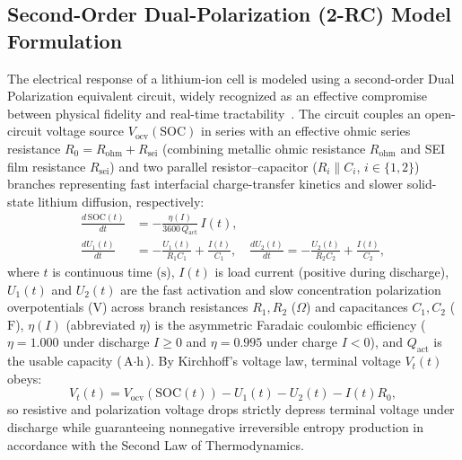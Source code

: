 \documentclass[10pt,a4paper]{article}
\begin{document}
\subsection{Second-Order Dual-Polarization (2-RC) Model Formulation}
The electrical response of a lithium-ion cell is modeled using a second-order Dual Polarization equivalent circuit, widely recognized as an effective compromise between physical fidelity and real-time tractability~\cite{Hu2012ecm,Xiong2014}. The circuit couples an open-circuit voltage source $V_{\text{ocv}}(\text{SOC})$ in series with an effective ohmic series resistance $R_0 = R_{\text{ohm}} + R_{\text{sei}}$ (combining metallic ohmic resistance $R_{\text{ohm}}$ and SEI film resistance $R_{\text{sei}}$) and two parallel resistor--capacitor ($R_i \parallel C_i$, $i \in \{1, 2\}$) branches representing fast interfacial charge-transfer kinetics and slower solid-state lithium diffusion, respectively:
\begin{align}
\frac{d\,\text{SOC}(t)}{dt} &= -\frac{\eta(I)}{3600\,Q_{\text{act}}}\,I(t), \label{eqn:soc_diff}\\
\frac{d U_1(t)}{dt} &= -\frac{U_1(t)}{R_1 C_1} + \frac{I(t)}{C_1}, \quad \frac{d U_2(t)}{dt} = -\frac{U_2(t)}{R_2 C_2} + \frac{I(t)}{C_2}, \label{eqn:u12_diff}
\end{align}
where $t$ is continuous time ($\text{s}$), $I(t)$ is load current (positive during discharge), $U_1(t)$ and $U_2(t)$ are the fast activation and slow concentration polarization overpotentials ($\text{V}$) across branch resistances $R_1, R_2$ ($\Omega$) and capacitances $C_1, C_2$ ($\text{F}$), $\eta(I)$ (abbreviated $\eta$) is the asymmetric Faradaic coulombic efficiency ($\eta = 1.000$ under discharge $I \ge 0$ and $\eta = 0.995$ under charge $I < 0$), and $Q_{\text{act}}$ is the usable capacity ($\text{A}\cdot\text{h}$). By Kirchhoff's voltage law, terminal voltage $V_t(t)$ obeys:
\begin{equation}\label{eqn:vt_diff}
V_t(t) = V_{\text{ocv}}(\text{SOC}(t)) - U_1(t) - U_2(t) - I(t) R_0,
\end{equation}
so resistive and polarization voltage drops strictly depress terminal voltage under discharge while guaranteeing nonnegative irreversible entropy production in accordance with the Second Law of Thermodynamics.
\end{document}
